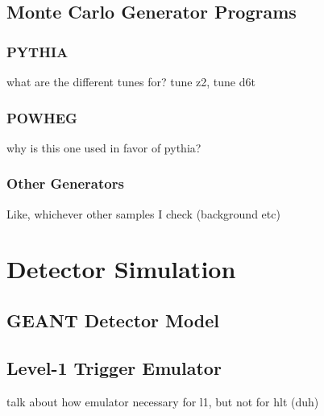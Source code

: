 \subsection{Monte Carlo Generator Programs}
\label{sim:MCGens}

\subsubsection{PYTHIA}
\label{sim:MCGensPythia}
what are the different tunes for?  tune z2, tune d6t

\subsubsection{POWHEG}
\label{sim:MCGensPowheg}
why is this one used in favor of pythia?  

\subsubsection{Other Generators}
\label{sim:MCGensOther}
Like, whichever other samples I check (background etc)



\section{Detector Simulation}
\label{sim:Detector}

\subsection{GEANT Detector Model}
\label{sim:DetectorGeant}

\subsection{Level-1 Trigger Emulator}
\label{sim:DetectorL1Emul}
talk about how emulator necessary for l1, but not for hlt (duh)
